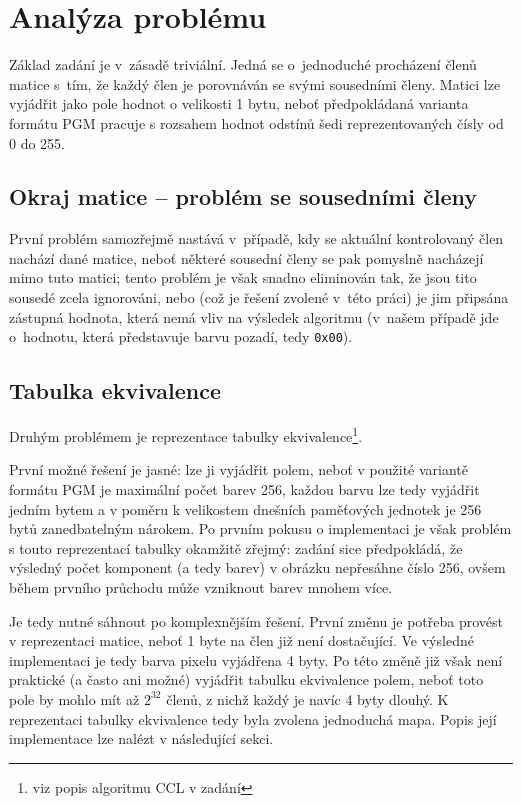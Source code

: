 \section{Analýza problému}

Základ zadání je v~zásadě triviální. Jedná se o~jednoduché procházení členů matice s~tím, že každý člen je porovnáván
se svými sousedními členy. Matici lze vyjádřit jako pole hodnot o velikosti 1 bytu, neboť předpokládaná varianta formátu
PGM pracuje s rozsahem hodnot odstínů šedi reprezentovaných čísly od 0 do 255.

\subsection[Okraj matice]{Okraj matice -- problém se sousedními členy}
První problém samozřejmě nastává v~případě, kdy se aktuální kontrolovaný člen nachází
 dané matice, neboť některé sousední členy se pak pomyslně nacházejí mimo tuto matici; tento problém je
však snadno eliminován tak, že jsou tito sousedé zcela ignorováni, nebo (což je řešení zvolené v~této práci) je jim
připsána zástupná hodnota, která nemá vliv na výsledek algoritmu (v~našem případě jde o~hodnotu, která představuje barvu
pozadí, tedy \verb|0x00|).

\subsection{Tabulka ekvivalence}
Druhým problémem je reprezentace tabulky ekvivalence\footnote{viz popis algoritmu CCL v zadání}.

První možné řešení je jasné: lze ji vyjádřit polem, neboť v použité variantě formátu PGM je maximální počet barev 256,
každou barvu lze tedy vyjádřit jedním bytem a v poměru k velikostem dnešních paměťových jednotek je 256 bytů
zanedbatelným nárokem. Po prvním pokusu o implementaci je však problém s touto reprezentací tabulky okamžitě zřejmý:
zadání sice předpokládá, že výsledný počet komponent (a tedy barev) v obrázku nepřesáhne číslo 256, ovšem během prvního
průchodu může vzniknout barev mnohem více.

Je tedy nutné sáhnout po komplexnějším řešení. První změnu je potřeba provést v reprezentaci matice, neboť 1 byte
na člen již není dostačující. Ve výsledné implementaci je tedy barva pixelu vyjádřena 4 byty. Po této změně již však
není praktické (a často ani možné) vyjádřit tabulku ekvivalence polem, neboť toto pole by mohlo mít až $ 2^{32} $ členů,
z nichž každý je navíc 4 byty dlouhý. K reprezentaci tabulky ekvivalence tedy byla zvolena jednoduchá mapa. Popis její
implementace lze nalézt v následující sekci.
